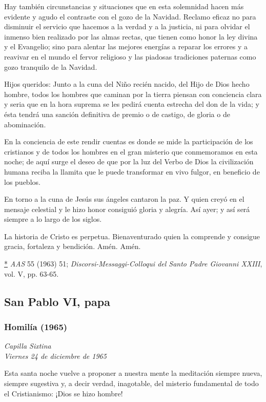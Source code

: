Hay también circunstancias y situaciones que en esta solemnidad hacen más evidente y agudo el contraste con el gozo de la Navidad. Reclamo eficaz no para disminuir el servicio que hacemos a la verdad y a la justicia, ni para olvidar el inmenso bien realizado por las almas rectas, que tienen como honor la ley divina y el Evangelio; sino para alentar las mejores energías a reparar los errores y a reavivar en el mundo el fervor religioso y las piadosas tradiciones paternas como gozo tranquilo de la Navidad.

Hijos queridos: Junto a la cuna del Niño recién nacido, del Hijo de Dios hecho hombre, todos los hombres que caminan por la tierra piensan con conciencia clara y seria que en la hora suprema se les pedirá cuenta estrecha del don de la vida; y ésta tendrá una sanción definitiva de premio o de castigo, de gloria o de abominación.

En la conciencia de este rendir cuentas es donde se mide la participación de los cristianos y de todos los hombres en el gran misterio que conmemoramos en esta noche; de aquí surge el deseo de que por la luz del Verbo de Dios la civilización humana reciba la llamita que le puede transformar en vivo fulgor, en beneficio de los pueblos.

En torno a la cuna de Jesús sus ángeles cantaron la paz. Y quien creyó en el mensaje celestial y le hizo honor consiguió gloria y alegría. Así ayer; y así será siempre a lo largo de los siglos.

La historia de Cristo es perpetua. Bienaventurado quien la comprende y consigue gracia, fortaleza y bendición. Amén. Amén.


\protect\hyperlink{_ednrefux2a}{*}\emph{ AAS} 55 (1963) 51; \emph{Discorsi-Messaggi-Colloqui del Santo Padre Giovanni XXIII}, vol. V, pp. 63-65.


\subsection{San Pablo VI, papa}

\subsubsection{Homilía (1965)} \emph{Capilla Sixtina\\ Viernes 24 de diciembre de 1965}


Esta santa noche vuelve a proponer a nuestra mente la meditación siempre nueva, siempre sugestiva y, a decir verdad, inagotable, del misterio fundamental de todo el Cristianismo: ¡Dios se hizo hombre!

